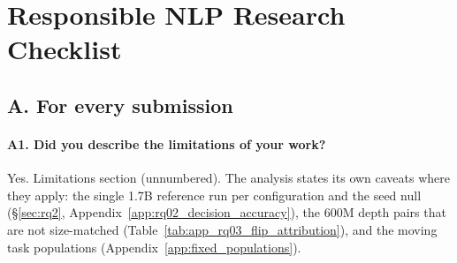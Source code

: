 
\section*{Responsible NLP Research Checklist}

\subsection*{A. For every submission}

\paragraph{A1. Did you describe the limitations of your work?}
Yes. Limitations section (unnumbered). The analysis states its own caveats where they apply: the single 1.7B reference run per configuration and the seed null (\S\ref{sec:rq2}, Appendix~\ref{app:rq02_decision_accuracy}), the 600M depth pairs that are not size-matched (Table~\ref{tab:app_rq03_flip_attribution}), and the moving task populations (Appendix~\ref{app:fixed_populations}).

